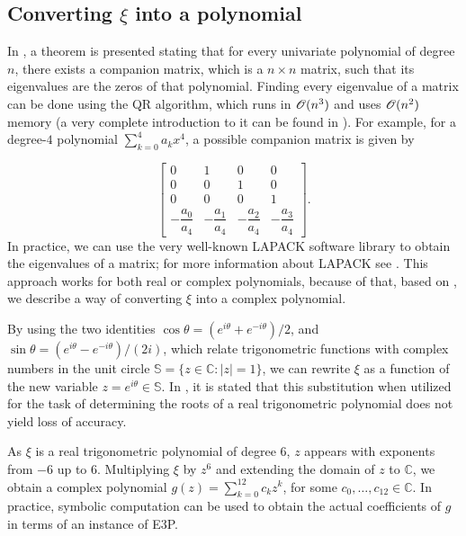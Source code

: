 \subsection{Converting $\xi$ into a polynomial}

In \cite[p.~195]{horn}, a theorem is presented stating that for every univariate polynomial of degree $n$, there exists a companion matrix, which is a $n\times n$ matrix, such that its eigenvalues are the zeros of that polynomial. Finding every eigenvalue of a matrix can be done using the QR algorithm, which runs in $\mathscr{O}(n^3)$ and uses $\mathscr{O}(n^2)$ memory (a very complete introduction to it can be found in \cite{watkins:2008}). For example, for a degree-$4$ polynomial $\sum_{k=0}^4 a_k x^4$, a possible companion matrix is given by

 \begin{equation*}
\left[\begin{array}{ccccc}
0 & 1 & 0 & 0\\
0 & 0 & 1 & 0\\
0 & 0 & 0 & 1\\
-\dfrac{a_0}{a_4} & -\dfrac{a_1}{a_4} & -\dfrac{a_2}{a_4} & -\dfrac{a_3}{a_4}
\end{array}\right].
\end{equation*}
In practice, we can use the very well-known LAPACK software library to obtain the eigenvalues of a matrix; for more information about LAPACK see \cite{lapack}.
This approach works for both real or complex polynomials, because of that, based on \cite{weidner}, we describe a way of converting $\xi$ into a complex polynomial.

By using the two identities $\cos{\theta} = (e^{i\theta} + e^{-i\theta})/2$, and $\sin{\theta} = (e^{i\theta} - e^{-i\theta})/(2i)$, which relate trigonometric functions with complex numbers in the unit circle $\mathbb{S}=\{z\in \mathbb{C}\colon |z|=1\}$, we can rewrite $\xi$ as a function of the new variable $z=e^{i\theta}\in\mathbb{S}$. In \cite{weidner}, it is stated that this substitution when utilized for the task of determining the roots of a real trigonometric polynomial does not yield loss of accuracy.

As $\xi$ is a real trigonometric polynomial of degree $6$, $z$ appears with exponents from $-6$ up to $6$. Multiplying $\xi$ by $z^6$ and extending the domain of $z$ to $\mathbb{C}$, we obtain a complex polynomial $g(z)=\sum_{k=0}^{12} c_k z^k$, for some $c_0, \dots, c_{12} \in \mathbb{C}$. In practice, symbolic computation can be used to obtain the actual coefficients of $g$ in terms of an instance of E3P.


